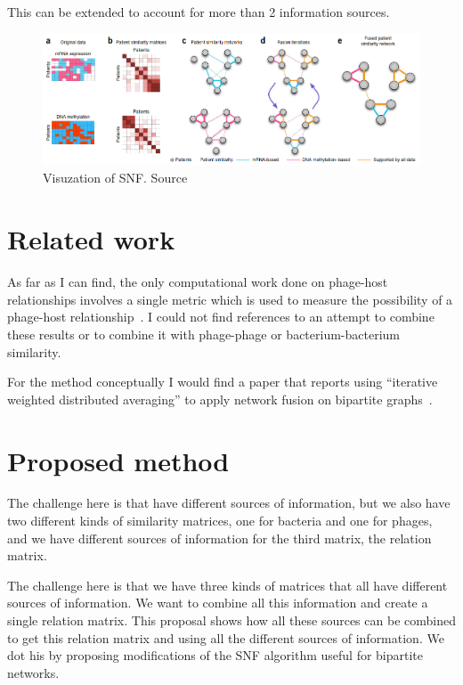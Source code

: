 \documentclass{article}
\begin{document}
This can be extended to account for more than 2 information sources.

\begin{figure}[ht]
    \centering
    \includegraphics[width=1\textwidth]{img/sim.png}
    \caption{Visuzation of SNF. Source~\cite{wang2014similarity}}\label{fig:sim}
\end{figure}

\section{Related work}

As far as I can find, the only computational work done on phage-host relationships 
involves a single metric which is used to measure the possibility of a phage-host relationship~\cite{edwards2016computational}.
I could not find references to an attempt to combine these results or to combine
it with phage-phage or bacterium-bacterium similarity.

For the method conceptually I would find a paper that reports using ``iterative weighted distributed averaging''
to apply network fusion on bipartite graphs~\cite{khan2007distributed}.

\section{Proposed method}

The challenge here is that have different sources of information, 
but we also have two different kinds of similarity matrices, one for bacteria
and one for phages, and we have different sources of information for the third
matrix, the relation matrix. 

The challenge here is that we have three kinds of matrices that all have
different sources of information. We want to combine all this information
and create a single relation matrix.
This proposal shows how all these sources can be
combined to get this relation matrix and using all the different sources of information.
We dot his by proposing modifications of the SNF algorithm useful for bipartite networks.
\end{document}
